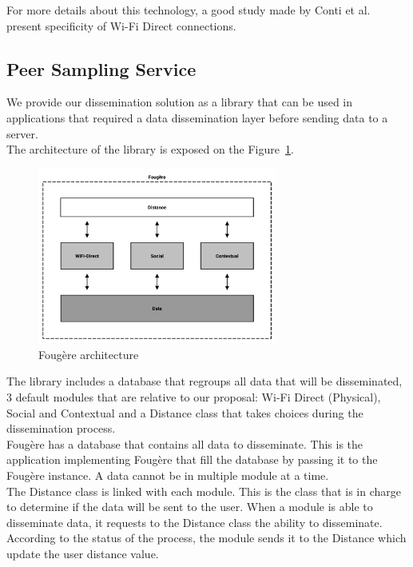 For more details about this technology, a good study made by Conti et al.~\cite{DBLP:conf/wd/ContiDMP13} present specificity of Wi-Fi Direct connections.

\subsection{Peer Sampling Service}

We provide our dissemination solution as a library that can be used in applications that required a data dissemination layer before sending data to a server.
\\

The architecture of the library is exposed on the Figure~\ref{Fougere}.

\begin{figure}[h]
	\centering
	\includegraphics[width=0.7\textwidth]{figures/fougere}
	\caption{\label{Fougere} Foug\`ere architecture}
\end{figure}

The library includes a database that regroups all data that will be disseminated, 3 default modules that are relative to our proposal: Wi-Fi Direct (Physical), Social and Contextual and a Distance class that takes choices during the dissemination process.
\\

Foug\`ere has a database that contains all data to disseminate.
This is the application implementing Foug\`ere that fill the database by passing it to the Foug\`ere instance.
A data cannot be in multiple module at a time.
\\

The Distance class is linked with each module.
This is the class that is in charge to determine if the data will be sent to the user.
When a module is able to disseminate data, it requests to the Distance class the ability to disseminate.
According to the status of the process, the module sends it to the Distance which update the user distance value.
\\

